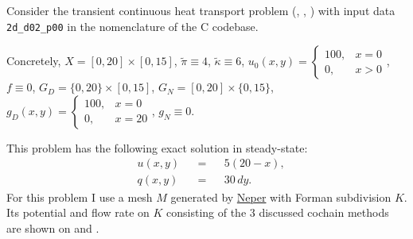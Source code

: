 \begin{example}
  \label{cmc/diffusion/continuous/transient/examples/2d_d02_p00-example}
  Consider the transient continuous heat transport problem
  (,
   ,
   )
  with input data \verb|2d_d02_p00| in the nomenclature of the C codebase.

  Concretely,
    $X = [0, 20] \times [0, 15]$,
    $\tilde{\pi} \equiv 4$,
    $\tilde{\kappa} \equiv 6$,
    $u_0(x, y) = \begin{cases} 100, & x = 0 \\ 0, & x > 0 \end{cases}$,
    $f \equiv 0$,
    $G_D = \{0, 20\} \times [0, 15]$,
    $G_N = [0, 20] \times \{0, 15\}$,
    $g_D(x, y) = \begin{cases} 100, & x = 0 \\ 0, & x = 20 \end{cases}$,
    $g_N \equiv 0$.

  This problem has the following exact solution in steady-state:
  \begin{subequations}
    \begin{alignat}{3}
      & u(x, y) && = && 5 (20 - x), \\
      & q(x, y) && = && 30 \, d y.
    \end{alignat}
  \end{subequations}
  For this problem I use a mesh $M$ generated by
  \href{https://neper.info/}{Neper} with Forman subdivision $K$.
  Its potential and flow rate on $K$ consisting of the $3$ discussed cochain
  methods are shown on
  and
  .
\end{example}
